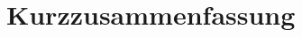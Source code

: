 \documentclass[ngerman,geometry,paper=a4,fontsize=12pt]{scrreprt}
\begin{document}
\onehalfspacing
\section*{Kurzzusammenfassung}

\lipsum[1-2] %
\end{document}
